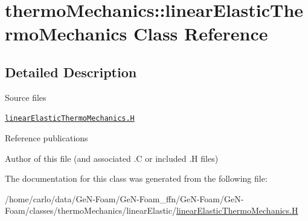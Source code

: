 \hypertarget{classFoam_1_1thermoMechanics_1_1linearElasticThermoMechanics}{}\section{thermo\+Mechanics\+:\+:linear\+Elastic\+Thermo\+Mechanics Class Reference}
\label{classFoam_1_1thermoMechanics_1_1linearElasticThermoMechanics}


\subsection{Detailed Description}
\label{_Description}%
 \begin{DoxyParagraph}{Source files}

\begin{DoxyItemize}
\item \href{../../../home/carlo/data/GeN-Foam/GeN-Foam_ffn/GeN-Foam/GeN-Foam/classes/thermoMechanics/linearElastic/linearElasticThermoMechanics.H}{\tt linear\+Elastic\+Thermo\+Mechanics.\+H} 
\end{DoxyItemize}Reference publications
\end{DoxyParagraph}
Author of this file (and associated .C or included .H files) 

The documentation for this class was generated from the following file\+:\begin{DoxyCompactItemize}
\item 
/home/carlo/data/\+Ge\+N-\/\+Foam/\+Ge\+N-\/\+Foam\+\_\+ffn/\+Ge\+N-\/\+Foam/\+Ge\+N-\/\+Foam/classes/thermo\+Mechanics/linear\+Elastic/\hyperlink{linearElasticThermoMechanics_8H}{linear\+Elastic\+Thermo\+Mechanics.\+H}\end{DoxyCompactItemize}

